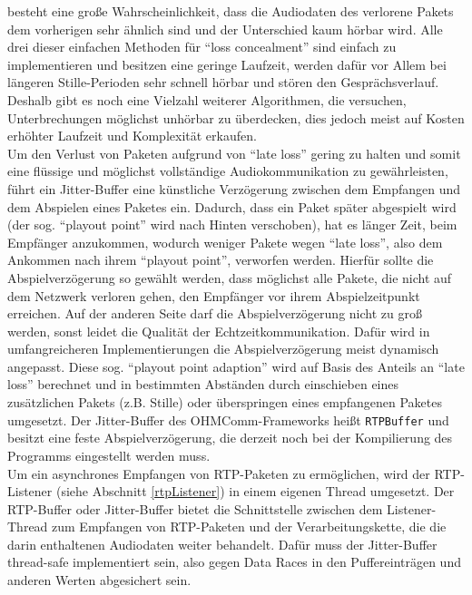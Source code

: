 besteht eine große Wahrscheinlichkeit, dass die Audiodaten des verlorene Pakets dem vorherigen sehr ähnlich sind und der Unterschied kaum hörbar wird. Alle drei dieser einfachen Methoden für \enquote{loss concealment} sind einfach zu implementieren und besitzen eine geringe Laufzeit, werden dafür vor Allem bei längeren Stille-Perioden sehr schnell hörbar und stören den Gesprächsverlauf. Deshalb gibt es noch eine Vielzahl weiterer Algorithmen, die versuchen, Unterbrechungen möglichst unhörbar zu überdecken, dies jedoch meist auf Kosten erhöhter Laufzeit und Komplexität erkaufen.
\\
Um den Verlust von Paketen aufgrund von \enquote{late loss} gering zu halten und somit eine flüssige und möglichst vollständige Audiokommunikation zu gewährleisten, führt ein Jitter-Buffer eine künstliche Verzögerung zwischen dem Empfangen und dem Abspielen eines Paketes ein. Dadurch, dass ein Paket später abgespielt wird (der sog. \enquote{playout point} wird nach Hinten verschoben), hat es länger Zeit, beim Empfänger anzukommen, wodurch weniger Pakete wegen \enquote{late loss}, also dem Ankommen nach ihrem \enquote{playout point}, verworfen werden. Hierfür sollte die Abspielverzögerung so gewählt werden, dass möglichst alle Pakete, die nicht auf dem Netzwerk verloren gehen, den Empfänger vor ihrem Abspielzeitpunkt erreichen. Auf der anderen Seite darf die Abspielverzögerung nicht zu groß werden, sonst leidet die Qualität der Echtzeitkommunikation. Dafür wird in umfangreicheren Implementierungen die Abspielverzögerung meist dynamisch angepasst. Diese sog. \enquote{playout point adaption} wird auf Basis des Anteils an \enquote{late loss} berechnet und in bestimmten Abständen durch einschieben eines zusätzlichen Pakets (z.B. Stille) oder überspringen eines empfangenen Paketes umgesetzt. Der Jitter-Buffer des OHMComm-Frameworks heißt \texttt{RTPBuffer} und besitzt eine feste Abspielverzögerung, die derzeit noch bei der Kompilierung des Programms eingestellt werden muss.
\\
Um ein asynchrones Empfangen von RTP-Paketen zu ermöglichen, wird der RTP-Listener (siehe Abschnitt \ref{rtpListener}) in einem eigenen Thread umgesetzt. Der RTP-Buffer oder Jitter-Buffer bietet die Schnittstelle zwischen dem Listener-Thread zum Empfangen von RTP-Paketen und der Verarbeitungskette, die die darin enthaltenen Audiodaten weiter behandelt. Dafür muss der Jitter-Buffer thread-safe implementiert sein, also gegen Data Races in den Puffereinträgen und anderen Werten abgesichert sein.
\\
